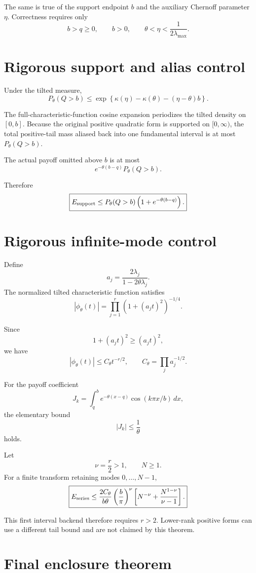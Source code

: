 The same is true of the support endpoint \(b\) and the auxiliary Chernoff
parameter \(\eta\).  Correctness requires only
\[
b>q\ge0,\qquad b>0,
\qquad
\theta<\eta<\frac{1}{2\lambda_{\max}}.
\]

\section{Rigorous support and alias control}

Under the tilted measure,
\[
P_\theta(Q>b)
\le
\exp\left\{
\kappa(\eta)-\kappa(\theta)-(\eta-\theta)b
\right\}.
\]

The full-characteristic-function cosine expansion periodizes the tilted density
on \([0,b]\).  Because the original positive quadratic form is supported on
\([0,\infty)\), the total positive-tail mass aliased back into one fundamental
interval is at most \(P_\theta(Q>b)\).

The actual payoff omitted above \(b\) is at most
\[
e^{-\theta(b-q)}P_\theta(Q>b).
\]

Therefore
\[
\boxed{
E_{\rm support}
\le
P_\theta(Q>b)
\left(
1+e^{-\theta(b-q)}
\right).
}
\]

\section{Rigorous infinite-mode control}

Define
\[
a_j=
\frac{2\lambda_j}{1-2\theta\lambda_j}.
\]
The normalized tilted characteristic function satisfies
\[
|\phi_\theta(t)|
=
\prod_{j=1}^r
\left(
1+(a_jt)^2
\right)^{-1/4}.
\]

Since
\[
1+(a_jt)^2\ge(a_jt)^2,
\]
we have
\[
|\phi_\theta(t)|
\le
C_\theta t^{-r/2},
\qquad
C_\theta=\prod_j a_j^{-1/2}.
\]

For the payoff coefficient
\[
J_k=
\int_q^b
e^{-\theta(x-q)}
\cos(k\pi x/b)\,dx,
\]
the elementary bound
\[
|J_k|\le\frac1\theta
\]
holds.

Let
\[
\nu=\frac r2>1,\qquad N\ge1.
\]
For a finite transform retaining modes \(0,\ldots,N-1\),
\[
\boxed{
E_{\rm series}
\le
\frac{2C_\theta}{b\theta}
\left(\frac{b}{\pi}\right)^\nu
\left[
N^{-\nu}
+
\frac{N^{1-\nu}}{\nu-1}
\right].
}
\]

This first interval backend therefore requires \(r>2\).  Lower-rank positive
forms can use a different tail bound and are not claimed by this theorem.

\section{Final enclosure theorem}


